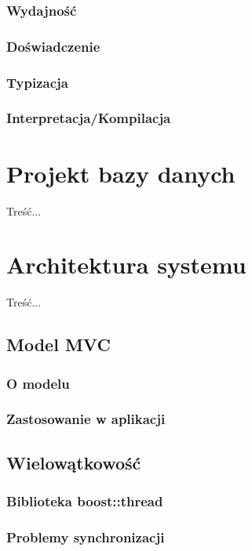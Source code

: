 {\subsubsection{Wydajność}
\par{
}
\subsubsection{Doświadczenie}
\subsubsection{Typizacja}
\subsubsection{Interpretacja/Kompilacja}

\section[Projekt bazy danych][Projekt bazy danych]{Projekt bazy danych}
\par{ Treść... }

\section[Architektura systemu][Architektura systemu]{Architektura systemu}
\par{ Treść... }
\subsection{Model MVC}
\subsubsection{O modelu}
\subsubsection{Zastosowanie w aplikacji}
\subsection{Wielowątkowość}
\subsubsection{Biblioteka boost::thread}
\subsubsection{Problemy synchronizacji}

}
